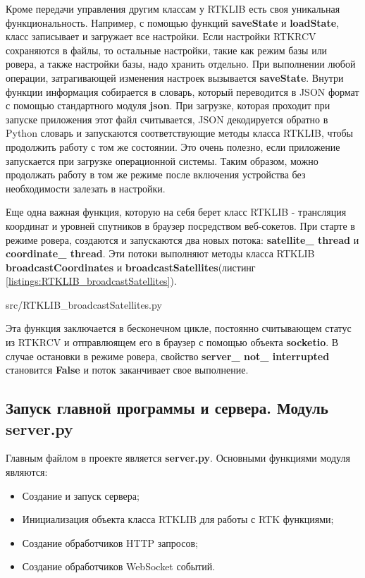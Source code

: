 Кроме передачи управления другим классам у RTKLIB есть своя уникальная функциональность. Например, с помощью функций \textbf{saveState} и \textbf{loadState}, класс записывает и загружает все настройки. Если настройки RTKRCV сохраняются в файлы, то остальные настройки, такие как режим базы или ровера, а также настройки базы, надо хранить отдельно. При выполнении любой операции, затрагивающей изменения настроек вызывается \textbf{saveState}. Внутри функции информация собирается в словарь, который переводится в JSON формат с помощью стандартного модуля \textbf{json}. При загрузке, которая проходит при запуске приложения этот файл считывается, JSON декодируется обратно в Python словарь и запускаются соответствующие методы класса RTKLIB, чтобы продолжить работу с том же состоянии. Это очень полезно, если приложение запускается при загрузке операционной системы. Таким образом, можно продолжать работу в том же режиме после включения устройства без необходимости залезать в настройки.

Еще одна важная функция, которую на себя берет класс RTKLIB - трансляция координат и уровней спутников в браузер посредством веб-сокетов. При старте в режиме ровера, создаются и запускаются два новых потока: \textbf{satellite\_ thread} и \textbf{coordinate\_ thread}. Эти потоки выполняют методы класса RTKLIB \textbf{broadcastCoordinates} и \textbf{broadcastSatellites}(листинг \ref{listings:RTKLIB_broadcastSatellites}).


{src/RTKLIB_broadcastSatellites.py}

Эта функция заключается в бесконечном цикле, постоянно считывающем статус из RTKRCV и отправлюящем его в браузер с помощью объекта \textbf{socketio}. В случае остановки в режиме ровера, свойство \textbf{server\_ not\_ interrupted} становится \textbf{False} и поток заканчивает свое выполнение.

\subsection{Запуск главной программы и сервера. Модуль server.py} \label{subsect3_1_5}

Главным файлом в проекте является \textbf{server.py}. Основными функциями модуля являются:

\begin{itemize}
  \item Создание и запуск сервера;
  \item Инициализация объекта класса RTKLIB для работы с RTK функциями;
  \item Создание обработчиков HTTP запросов;
  \item Создание обработчиков WebSocket событий.
\end{itemize}


